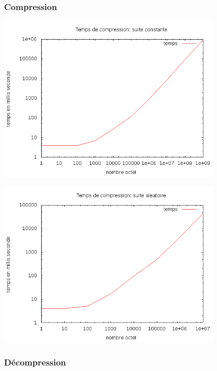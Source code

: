 \documentclass{report}
\begin{document}
\subsubsection*{Compression}
\begin{center}
\includegraphics[width=11cm]{tempsClzC.png}
\end{center}
\begin{center}
\includegraphics[width=11cm]{tempsClzA.png}
\end{center}
\subsubsection*{Décompression}
\end{document}
